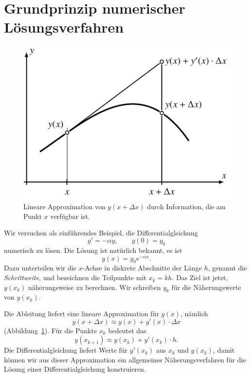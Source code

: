 %
%
%
\section{Grundprinzip numerischer Lösungsverfahren}
\begin{figure}
\centering
\includegraphics{chapters/50-ode/figures/prinzip.pdf}
\caption{Lineare Approximation von $y(x+\Delta x)$ durch Information,
die am Punkt $x$ verfügbar ist.
\label{buch:ode:lineareapproximation}}
\end{figure}
Wir versuchen als einführendes Beispiel, die Differentialgleichung
\begin{equation}
y'=-\alpha y,\qquad y(0)=y_0
\label{buch:ode:expdgl}
\end{equation}
numerisch zu lösen. 
Die Lösung ist natürlich bekannt, es ist 
\begin{equation}
y(x)=y_0e^{-\alpha x}.
\label{buch:ode:beispiel-loesung}
\end{equation}
Dazu unterteilen wir die $x$-Achse in diskrete Abschnitte der Länge $h$,
genannt die {\em Schrittweite},
%
und bezeichnen die Teilpunkte mit $x_k=kh$.
Das Ziel ist jetzt, $y(x_k)$ näherungsweise zu berechnen.
Wir schreiben $y_k$ für die Näherungswerte von $y(x_k)$.

Die Ableitung liefert eine lineare Approximation für $y(x)$,
%
%
nämlich
\[
y(x+\Delta x)\approx y(x) + y'(x)\cdot\Delta x
\]
(Abbildung~\ref{buch:ode:lineareapproximation}).
Für die Punkte $x_k$ bedeutet das
\[
y(x_{k+1})\approx y(x_{k})+y'(x_k)\cdot h.
\]
Die Differentialgleichung liefert Werte für $y'(x_k)$ aus $x_k$ und $y(x_k)$,
damit können wir aus dieser Approximation ein allgemeines
Näherungsverfahren für die Lösung einer Differentialgleichung
konstruieren.
%

